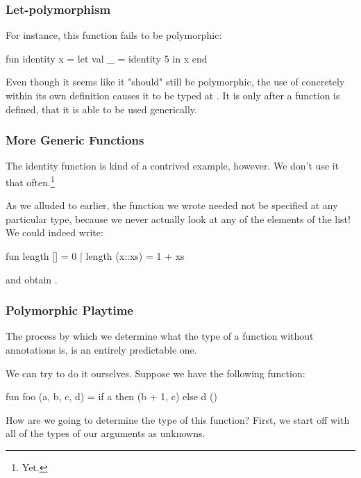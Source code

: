 \documentclass[aspectratio=169, handout]{beamer}
\begin{document}
\begin{frame}[fragile]
  \frametitle{Let-polymorphism}

  For instance, this function fails to be polymorphic:
  \pause
  \begin{codeblock}
    fun identity x =
      let
        val _ = identity 5
      in
        x
      end
  \end{codeblock}

  \pause
  \vspace{\fill}

  Even though it seems like it "should" still be polymorphic, the use of 
  concretely within its own definition causes it to be typed at . It
  is only after a function is defined, that it is able to be used generically.
\end{frame}

\begin{frame}[fragile]
  \frametitle{More Generic Functions}

  The identity function is kind of a contrived example, however. We don't use it that
  often.\footnote{Yet.}

  \pause
  \vspace{\fill}

  As we alluded to earlier, the  function we wrote needed not be specified
  at any particular type, because we never actually look at any of the elements of
  the list! We could indeed write:

  \pause
  \vspace{\fill}

  \begin{codeblock}
    fun length [] = 0
      | length (x::xs) = 1 + xs
  \end{codeblock}

  and obtain .
\end{frame}

\begin{frame}[fragile]
  \frametitle{Polymorphic Playtime}

  The process by which we determine what the type of a function without
  annotations is, is an entirely predictable one.

  \pause
  \vspace{\fill}

  We can try to do it ourselves. Suppose we have the following function:

  \pause
  \begin{codeblock}
    fun foo (a, b, c, d) =
      if a then
        (b + 1, c)
      else
        d ()
  \end{codeblock}

  \pause
  \vspace{\fill}

  How are we going to determine the type of this function? First, we
  start off with all of the types of our arguments as unknowns.
\end{frame}
\end{document}
